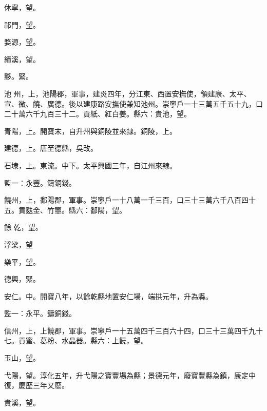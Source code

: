 \begin{pinyinscope}
 休寧，望。



 祁門，望。



 婺源，望。



 績溪，望。



 黟。緊。



 池
 州，上，池陽郡，軍事，建炎四年，分江東、西置安撫使，領建康、太平、宣、微、饒、廣德。後以建康路安撫使兼知池州。崇寧戶一十三萬五千五十九，口二十萬六千九百三十二。貢紙、紅白姜。縣六：貴池，望。



 青陽，上。開寶末，自升州與銅陵並來隸。銅陵，上。



 建德，上。唐至德縣，吳改。



 石埭，上。東流。中下。太平興國三年，自江州來隸。



 監一：永豐。鑄銅錢。



 饒州，上，鄱陽郡，軍事。崇寧戶一十八萬一千三百，口三十三萬六千八百四十五。貢麩金、竹簟。縣六：鄱陽，望。



 餘
 乾，望。



 浮梁，望



 樂平，望。



 德興，緊。



 安仁。中。開寶八年，以餘乾縣地置安仁場，端拱元年，升為縣。



 監一：永平。鑄銅錢。



 信州，上，上饒郡，軍事。崇寧戶一十五萬四千三百六十四，口三十三萬四千九十七。貢蜜、葛粉、水晶器。縣六：上饒，望。



 玉山，望。



 弋陽，望。淳化五年，升弋陽之寶豐場為縣；景德元年，廢寶豐縣為鎮，康定中復，慶歷三年又廢。



 貴溪，望。




\end{pinyinscope}
